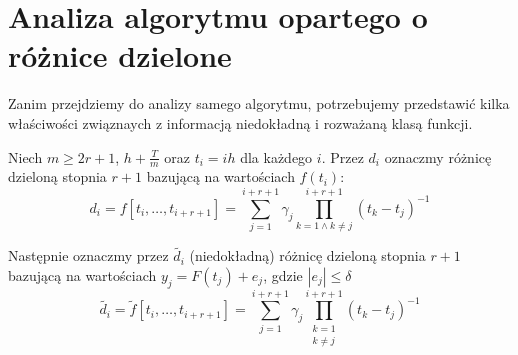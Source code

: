 \documentclass[oik, pdftex, robocza, man]{mgrwms}
\begin{document}
\section{Analiza algorytmu opartego o różnice dzielone}


    Zanim przejdziemy do analizy samego algorytmu, potrzebujemy przedstawić kilka właściwości związnaych z informacją niedokładną i rozważaną klasą funkcji.

    Niech $m \geq 2r + 1$, $h + \frac{T}{m}$ oraz $t_{i} = ih$ dla każdego $i$. Przez $d_{i}$ oznaczmy różnicę dzieloną stopnia $r+1$ bazującą na wartościach $f(t_{i})$:
    \begin{equation*}
        d_{i} = f[t_{i}, \dots, t_{i+r+1}] = \sum_{j = 1}^{i+r+1} \gamma_{j} \prod_{k=1 \land k \neq j}^{i+r+1}(t_{k}-t_{j})^{-1}
    \end{equation*}

    Następnie oznaczmy przez $\tilde{d_i}$ (niedokładną) różnicę dzieloną stopnia $r+1$ bazującą na wartościach $y_{j} = F(t_{j}) + e_{j}$, gdzie $|e_{j}| \leq \delta$
    \begin{equation*}
        \tilde{d_{i}} = \tilde{f}[t_{i}, \dots, t_{i+r+1}] = \sum_{j = 1}^{i+r+1} \gamma_{j} \prod_{\substack{k=1 \\ k \neq j}}^{i+r+1}(t_{k}-t_{j})^{-1}
    \end{equation*}
\end{document}
